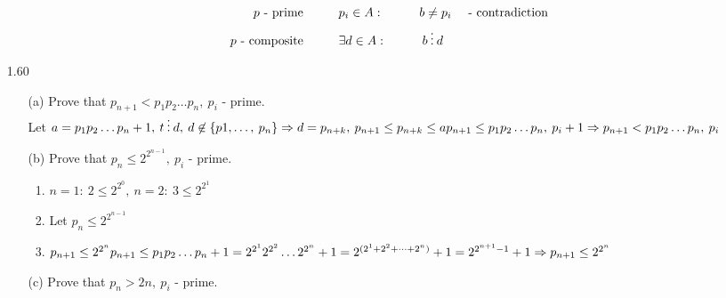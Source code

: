 \documentclass[a4paper,12pt]{article}
\newcommand\tab[1][1cm]{\hspace*{#1}}
\begin{document}
\begin{itemize}
\begin{itemize}
\begin{align*}
		p\textrm{ - prime} &\tab  p_i\in A:\tab b\neq p_i&\textrm{ - contradiction}\\
		 p\textrm{ - composite} &\tab\exists d\in A:\tab b\>\vdots\>d
	\end{align*}
	\end{itemize}
	\item [1.60] \begin{itemize}
		\item [(a)] Prove that $p_{n+1}<p_1p_2\dots p_n,\>p_i$ - prime.\\Let $a=p_1p_2\dots p_n+1,\>t\>\vdots\>d,\>d\not\in\{p1,\dots,\>p_n\}\Rightarrow d=p_{n+k},\>p_{n+1}\leq p_{n+k}\leq a\\p_{n+1}\leq p_1p_2\dots p_n,\>p_i+1\Rightarrow p_{n+1}<p_1p_2\dots p_n,\>p_i$
		\item [(b)] Prove that $p_{n}\leq2^{2^{n-1}},\>p_i$ - prime. \begin{enumerate}
			\item $n=1:\>2\leq2^{2^0},\>n=2:\>3\leq2^{2^1}$
			\item Let $p_{n}\leq2^{2^{n-1}}$
			\item $p_{n+1}\leq2^{2^{n}}\\p_{n+1}\leq p_1p_2\dots p_n+1= 2^{2^1}2^{2^2}\dots2^{2^n}+1=2^{(2^1+2^2+\dots+2^n)}+1=2^{2^{n+1}-1}+1\\\Rightarrow p_{n+1}\leq 2^{2^n}$
		\end{enumerate}
		\item [(c)] Prove that $p_{n}>2n,\>p_i$ - prime.
	\end{itemize}
\end{itemize}
\end{document}
